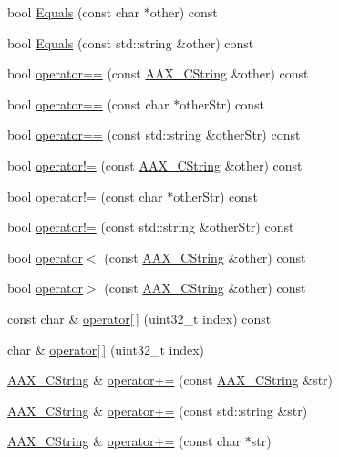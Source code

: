 \begin{DoxyCompactItemize}
bool \hyperlink{a00042_a5c86a60b0e57718e9c9c353b70fa9855}{Equals} (const char $\ast$other) const 
\item 
bool \hyperlink{a00042_a730350a9df26c1e8bf5adb29b31551bb}{Equals} (const std\+::string \&other) const 
\item 
bool \hyperlink{a00042_a341191f31630f76d8b5014800d185a27}{operator==} (const \hyperlink{a00042}{A\+A\+X\+\_\+\+C\+String} \&other) const 
\item 
bool \hyperlink{a00042_a9a8d237f25c8f295dfe678975250af02}{operator==} (const char $\ast$other\+Str) const 
\item 
bool \hyperlink{a00042_a88207de6a00a25105c2517dc52b07441}{operator==} (const std\+::string \&other\+Str) const 
\item 
bool \hyperlink{a00042_a6c2a9046acc1cd7d60fbf8dff9ce607e}{operator!=} (const \hyperlink{a00042}{A\+A\+X\+\_\+\+C\+String} \&other) const 
\item 
bool \hyperlink{a00042_a08f5a7612781332849b597d113f93674}{operator!=} (const char $\ast$other\+Str) const 
\item 
bool \hyperlink{a00042_a3db3523c82b471afd3e8ce99f9c42545}{operator!=} (const std\+::string \&other\+Str) const 
\item 
bool \hyperlink{a00042_a8d179fb0f0b52868545873969e5590c1}{operator$<$} (const \hyperlink{a00042}{A\+A\+X\+\_\+\+C\+String} \&other) const 
\item 
bool \hyperlink{a00042_a38e578601bc3ef1f0b51ca93d7d435a5}{operator$>$} (const \hyperlink{a00042}{A\+A\+X\+\_\+\+C\+String} \&other) const 
\item 
const char \& \hyperlink{a00042_a48c5d06540798492ceb32307420f42cf}{operator\mbox{[}$\,$\mbox{]}} (uint32\+\_\+t index) const 
\item 
char \& \hyperlink{a00042_ac27c664f0dcca1d36e516b3678763e07}{operator\mbox{[}$\,$\mbox{]}} (uint32\+\_\+t index)
\item 
\hyperlink{a00042}{A\+A\+X\+\_\+\+C\+String} \& \hyperlink{a00042_a38c818c2719546d7060504b586a38ab9}{operator+=} (const \hyperlink{a00042}{A\+A\+X\+\_\+\+C\+String} \&str)
\item 
\hyperlink{a00042}{A\+A\+X\+\_\+\+C\+String} \& \hyperlink{a00042_a771f06413be5ec1e228aaa2c9ea2b4fa}{operator+=} (const std\+::string \&str)
\item 
\hyperlink{a00042}{A\+A\+X\+\_\+\+C\+String} \& \hyperlink{a00042_ae339e119bf41150c10e06f6912f8b14c}{operator+=} (const char $\ast$str)
\end{DoxyCompactItemize}
